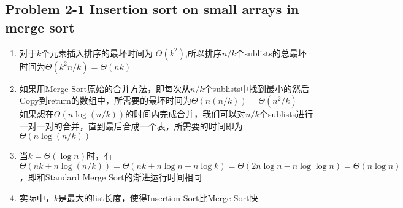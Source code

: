 \subsection*{Problem 2-1 Insertion sort on small arrays in merge sort}

\begin{enumerate}
	\item	对于$k$个元素插入排序的最坏时间为 $\Theta(k^2)$,所以排序$n/k$个sublists的总最坏时间为$\Theta(k^2n/k)=\Theta(nk)$
	\item	如果用Merge Sort原始的合并方法，即每次从$n/k$个sublists中找到最小的然后Copy到return的数组中，所需要的最坏时间为$\Theta(n(n/k))=\Theta(n^2/k)$ \\
		如果想在$\Theta(n\log(n/k))$的时间内完成合并，我们可以对$n/k$个sublists进行一对一对的合并，直到最后合成一个表，所需要的时间即为$\Theta(n\log(n/k))$
	\item	当$k=\Theta(\log{n})$时，有$\Theta(nk+n\log(n/k))=\Theta(nk+n\log{n}-n\log{k})=\Theta(2n\log{n}-n\log{\log{n}})=\Theta(n\log{n})$，即和Standard Merge Sort的渐进运行时间相同
	\item	实际中，$k$是最大的list长度，使得Insertion Sort比Merge Sort快
\end{enumerate}

